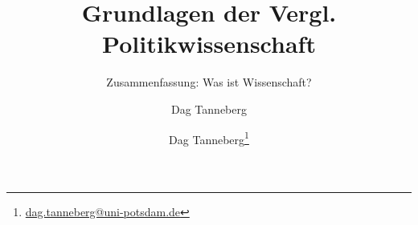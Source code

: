 \usepackage[ngerman]{babel}
\usepackage{graphicx}
\usepackage{hyperref}
\usepackage{multirow}
\usepackage{booktabs}
\usepackage{tikz}
  \usetikzlibrary{positioning}
  \usetikzlibrary{calc}
  \usetikzlibrary{matrix}
\usepackage{adjustbox}


\author{Dag Tanneberg}
\title{Grundlagen der Vergl. Politikwissenschaft}
\subtitle{Zusammenfassung: Was ist Wissenschaft?}
\author{Dag Tanneberg\thanks{%
  \href{mailto:dag.tanneberg@uni-potsdam.de}%
    {dag.tanneberg@uni-potsdam.de}
  }
}
\hypersetup{colorlinks, urlcolor = red, linkcolor = }
